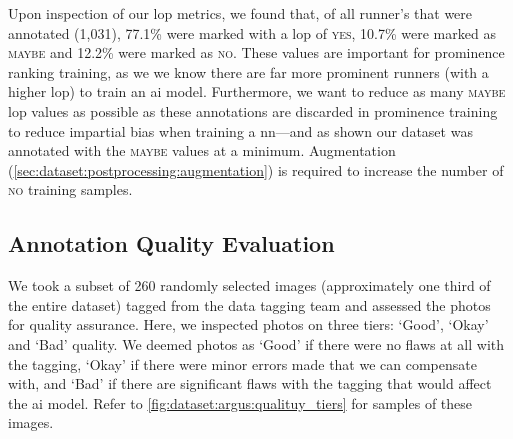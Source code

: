 Upon inspection of our \gls{lop} metrics, we found that, of all runner's that were annotated (1,031), 77.1\% were marked with a \gls{lop} of \textsc{yes}, 10.7\% were marked as \textsc{maybe} and 12.2\% were marked as \textsc{no}. These values are important for prominence ranking training, as we we know there are far more prominent runners (with a higher \gls{lop}) to train an \gls{ai} model. Furthermore, we want to reduce as many \textsc{maybe} \gls{lop} values as possible as these annotations are discarded in prominence training to reduce impartial bias when training a \gls{nn}---and as shown our dataset was annotated with the \textsc{maybe} values at a minimum. Augmentation (\cref{sec:dataset:postprocessing:augmentation}) is required to increase the number of \textsc{no} training samples.

\subsection{Annotation Quality Evaluation}
\label{sec:dataset:argus:quality_eval}

We took a subset of 260 randomly selected images  (approximately one third of the entire dataset) tagged from the data tagging team and assessed the photos for quality assurance. Here, we inspected photos on three tiers: `Good', `Okay' and `Bad' quality. We deemed photos as `Good' if there were no flaws at all with the tagging, `Okay' if there were minor errors made that we can compensate with, and `Bad' if there are significant flaws with the tagging that would affect the \gls{ai} model. Refer to \cref{fig:dataset:argus:qualituy_tiers} for samples of these images.


